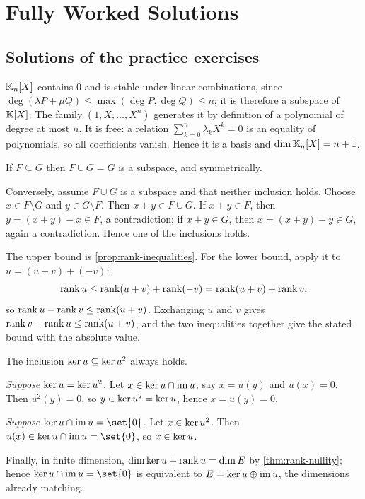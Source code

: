 \chapter{Fully Worked Solutions}
\label{ch:solutions}

\section{Solutions of the practice exercises}

\begin{solution}{}
$\mathbb{K}_{n}[X]$ contains $0$ and is stable under linear combinations, since
$\deg(\lambda P+\mu Q)\leq\max(\deg P,\deg Q)\leq n$; it is therefore a subspace
of $\mathbb{K}[X]$. The family $(1,X,\dots,X^{n})$ generates it by definition of a
polynomial of degree at most $n$. It is free: a relation
$\sum_{k=0}^{n}\lambda_kX^{k}=0$ is an equality of polynomials, so all
coefficients vanish. Hence it is a basis and $\dim\mathbb{K}_{n}[X]=n+1$.
\end{solution}

\begin{solution}{}
If $F\subseteq G$ then $F\cup G=G$ is a subspace, and symmetrically.

Conversely, assume $F\cup G$ is a subspace and that neither inclusion holds.
Choose $x\in F\setminus G$ and $y\in G\setminus F$. Then $x+y\in F\cup G$.
If $x+y\in F$, then $y=(x+y)-x\in F$, a contradiction; if $x+y\in G$, then
$x=(x+y)-y\in G$, again a contradiction. Hence one of the inclusions holds.
\end{solution}

\begin{solution}{}
The upper bound is \cref{prop:rank-inequalities}. For the lower bound, apply it
to $u=(u+v)+(-v)$:
\[
  \operatorname{rank} u\leq\operatorname{rank}(u+v)+\operatorname{rank}(-v)=\operatorname{rank}(u+v)+\operatorname{rank} v,
\]
so $\operatorname{rank} u-\operatorname{rank} v\leq\operatorname{rank}(u+v)$. Exchanging $u$ and $v$ gives
$\operatorname{rank} v-\operatorname{rank} u\leq\operatorname{rank}(u+v)$, and the two inequalities together give the
stated bound with the absolute value.
\end{solution}

\begin{solution}{}
The inclusion $\operatorname{ker} u\subseteq\operatorname{ker} u^{2}$ always holds.

\emph{Suppose $\operatorname{ker} u=\operatorname{ker} u^{2}$.} Let $x\in\operatorname{ker} u\cap\operatorname{im} u$, say $x=u(y)$ and
$u(x)=0$. Then $u^{2}(y)=0$, so $y\in\operatorname{ker} u^{2}=\operatorname{ker} u$, hence $x=u(y)=0$.

\emph{Suppose $\Ker u\cap\im u=\set{0}$.} Let $x\in\operatorname{ker} u^{2}$. Then
$u(x)\in\Ker u\cap\im u=\set{0}$, so $x\in\operatorname{ker} u$.

Finally, in finite dimension, $\dim\operatorname{ker} u+\operatorname{rank} u=\dim E$ by
\cref{thm:rank-nullity}; hence $\Ker u\cap\im u=\set{0}$ is equivalent to
$E=\operatorname{ker} u\oplus\operatorname{im} u$, the dimensions already matching.
\end{solution}

